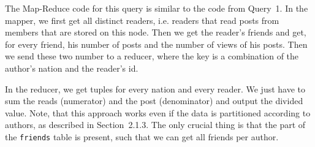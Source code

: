 \documentclass[12pt]{article}
\begin{document}
The Map-Reduce code for this query is similar to the code from Query~1. In the mapper, we first get all distinct readers, i.e. readers that read posts from members that are stored on this node. Then we get the reader's friends and get, for every friend, his number of posts and the number of views of his posts. Then we send these two number to a reducer, where the key is a combination of the author's nation and the reader's id.

In the reducer, we get tuples for every nation and every reader. We just have to sum the reads (numerator) and the post (denominator) and output the divided value. Note, that this approach works even if the data is partitioned according to authors, as described in Section~2.1.3. The only crucial thing is that the part of the \lstinline{friends} table is present, such that we can get all friends per author.
\end{document}
